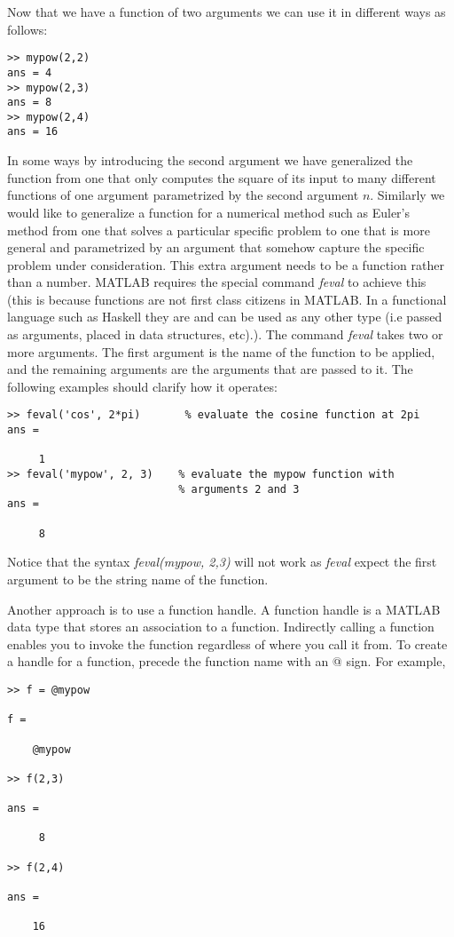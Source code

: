 \documentclass [titlepage,12pt,letter] {article}
\begin{document}
Now that we have a function of two arguments we can 
use it in different ways as follows: 
\begin{verbatim} 
>> mypow(2,2) 
ans = 4 
>> mypow(2,3)
ans = 8 
>> mypow(2,4)
ans = 16
\end{verbatim} 

In some ways by introducing the second argument we have generalized
the function from one that only computes the square of its input to 
many different functions of one argument parametrized by the second
argument $n$. Similarly we would like to generalize a function for a
numerical method such as Euler's method from one that solves a
particular specific problem to one that is more general and
parametrized by an argument that somehow capture the specific problem 
under consideration. This extra argument needs to be a function rather 
than a number. MATLAB requires the special command {\it feval} to
achieve this (this is because functions are not first class citizens
in MATLAB. In a functional language such as Haskell they are and 
can be used as any other type (i.e passed as arguments, placed in 
data structures, etc).). The command {\it feval} takes two or more
arguments. The first argument is the name of the function to be
applied, and the remaining arguments are the arguments that are passed
to it. The following examples should clarify how it operates: 

\begin{verbatim}
>> feval('cos', 2*pi)       % evaluate the cosine function at 2pi 
ans =

     1
>> feval('mypow', 2, 3)    % evaluate the mypow function with
                           % arguments 2 and 3 
ans =

     8
\end{verbatim} 

\noindent 
Notice that the syntax {\it feval(mypow, 2,3)} will not work as {\it
  feval} expect the first argument to be the string name of the
function.

Another approach is to use a function handle. A function handle is a MATLAB data type that stores an association to a function. Indirectly calling a function enables you to invoke the function regardless of where you call it from. To create a handle for a function, precede the function name with an @ sign. For example,

\begin{verbatim}
>> f = @mypow

f = 

    @mypow

>> f(2,3)

ans =

     8

>> f(2,4)

ans =

    16
\end{verbatim}
\end{document}
